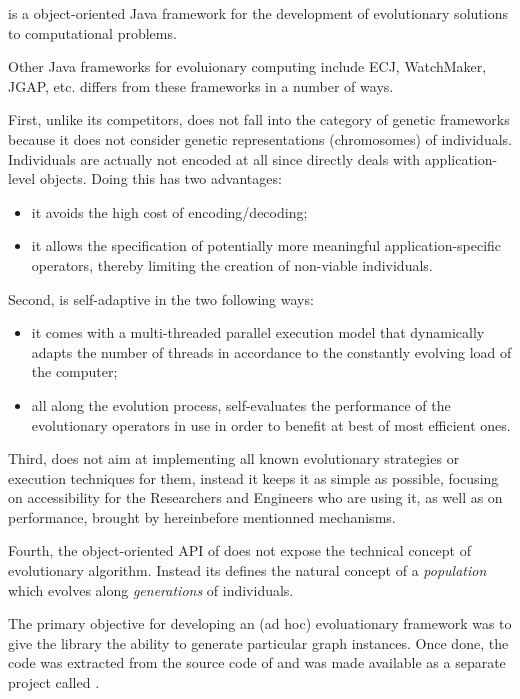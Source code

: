 \documentclass{article}
\begin{document}
\drwin is a object-oriented Java framework for the development of evolutionary
solutions to computational problems.

Other Java frameworks for evoluionary computing include ECJ, WatchMaker, JGAP,
etc. \drwin differs from these frameworks in a number of ways.

First, unlike its competitors, \drwin 
does not fall into the category of genetic frameworks because it does
not consider genetic  representations (chromosomes) of individuals. Individuals
are actually not encoded at all since \drwin directly deals with
application-level objects.
Doing this has two advantages:
\begin{itemize}
  \item it avoids the high cost of encoding/decoding;
  \item it allows the specification of potentially more
  meaningful application-specific operators, thereby limiting the creation of
  non-viable individuals.
\end{itemize}
  
Second, \drwin is self-adaptive in the two following ways:
\begin{itemize}
  \item it comes with a multi-threaded parallel execution model that
  dynamically adapts the number of threads in accordance to the constantly
  evolving load of the computer;
  \item all along the evolution process, \drwin self-evaluates the performance
  of the evolutionary operators in use in order to benefit at best of
  most efficient ones.
\end{itemize}

Third, \drwin does not aim at implementing all known evolutionary strategies or
execution techniques for them, instead it keeps it as simple as possible,
focusing on accessibility for the Researchers and Engineers who are using it, as
well as on performance, brought by hereinbefore mentionned mechanisms.

Fourth, the object-oriented API of \drwin does not expose the technical concept
of evolutionary algorithm. Instead its defines the natural concept of a 
\textit{population} which evolves along \textit{generations} of individuals.



The primary objective for developing an (ad hoc) evoluationary framework was to
give the \grph library the ability to generate particular graph instances.
Once done, the code was extracted from the source code of
\grph and was made available as a separate project called \drwin.
\end{document}
